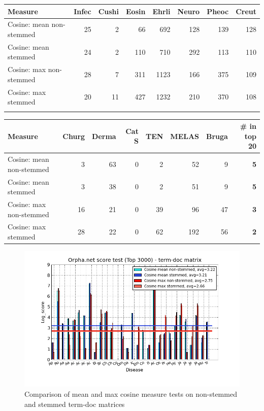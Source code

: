 \begin{table}[H]
  \begin{tiny}
  \begin{tabular}{|l|r|r|r|r|r|r|r|}
    \hline
    Measure &Infec&Cushi&Eosin&Ehrli&Neuro&Pheoc&Creut \\
    \hline
    Cosine: mean non-stemmed &25&2&66&692&128&139&128 \\
    \hline
    Cosine: mean stemmed &24&2&110&710&292&113&110 \\
    \hline
    Cosine: max non-stemmed &28&7&311&1123&166&375&109 \\
    \hline
    Cosine: max stemmed &20&11&427&1232&210&370&108 \\
    \hline
  \multicolumn{8}{c}{} \\
  \end{tabular}
  \begin{tabular}{|l|r|r|r|r|r|r|r|}
    \hline
    Measure &Churg&Derma&Cat S&TEN&MELAS&Bruga& \scriptsize{\textbf{\# in top 20}} \\
    \hline
    Cosine: mean non-stemmed &3&63&0&2&52&9& \scriptsize{\textbf{5}} \\
    \hline
    Cosine: mean stemmed &3&38&0&2&51&9& \scriptsize{\textbf{5}}\\
    \hline
    Cosine: max non-stemmed &16&21&0&39&96&47& \scriptsize{\textbf{3}} \\
    \hline
    Cosine: max stemmed &28&22&0&62&192&56& \scriptsize{\textbf{2}} \\
    \hline
  \end{tabular}
  \end{tiny}
\end{table}

\begin{figure}[H]
  \caption{Comparison of mean and max cosine measure tests on non-stemmed and stemmed term-doc matrices}
  \begin{center}
    \includegraphics[width=1.2\textwidth]{barcharts/termDoc_orphan_hist_3000_ns_mea_s_mea_ns_max_s_max.png}
  \end{center}
  \label{termDoc_orphan_hist_3000_ns_mea_s_mea_ns_max_s_max}
\end{figure}

